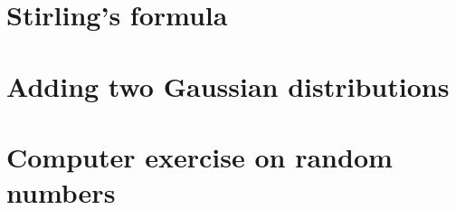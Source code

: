 \documentclass[11 pt]{article}
\begin{document}
    \section{Stirling's formula}
    

    \section{Adding two Gaussian distributions}
    

    \section{Computer exercise on random numbers}
    
\end{document}
